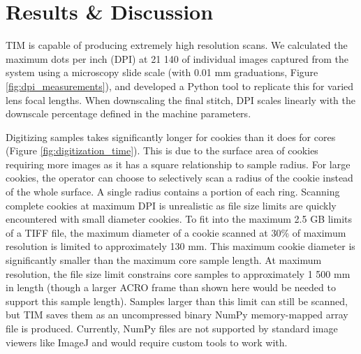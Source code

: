 \documentclass[a4paper,12pt]{article}
\begin{document}
\section{Results \& Discussion} 



TIM is capable of producing extremely high resolution scans. We calculated the maximum dots per inch (DPI) at 21 140 of individual images captured from the system using a microscopy slide scale (with 0.01 mm graduations, Figure \ref{fig:dpi_measurements}), and developed a Python tool to replicate this for varied lens focal lengths. When downscaling the final stitch, 
DPI scales linearly with the downscale percentage defined in the machine parameters. 

Digitizing samples takes significantly longer for cookies than it does for cores (Figure \ref{fig:digitization_time}). This is due to the surface area of cookies requiring more images as it has a square relationship to sample radius.
For large cookies, the operator can choose to selectively scan a radius of the cookie instead of the whole surface. A single radius contains a portion of each ring. Scanning complete cookies at maximum DPI is unrealistic as file size limits are quickly encountered with small diameter cookies. %
To fit into the maximum 2.5 GB limits of a TIFF file, the maximum diameter of a cookie scanned at 30\% of maximum resolution is limited to approximately 130 mm. This maximum cookie diameter is significantly smaller than the maximum core sample length. At maximum resolution, the file size limit 
constrains core samples to approximately 1 500 mm in length (though a larger ACRO frame than shown here would be needed to support this sample length). Samples larger than this limit can still be scanned, but TIM saves them as an uncompressed binary NumPy memory-mapped array file is produced. Currently, NumPy files are not supported by standard image viewers like ImageJ and would require custom tools to work with. %
\end{document}
